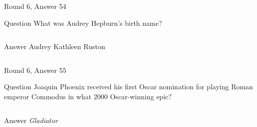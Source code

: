 \documentclass[11pt]{beamer}
\begin{document}
\begin{frame}[t]{Round 6, Answer 54}
  \vspace{2em}
  \begin{block}{Question}
    What was Audrey Hepburn's birth name?
  \end{block}
  \pause{}
  \begin{columns}[T,totalwidth=\linewidth]
    \begin{column}{0.35\linewidth}
      \begin{block}{Answer}
        Audrey Kathleen Ruston
      \end{block}
    \end{column}
    \begin{column}{0.6\linewidth}
      \begin{center}
        \texttt{[image: \{Images/hepburn]}.jpg}
      \end{center}
    \end{column}
  \end{columns}
\end{frame}


\begin{frame}[t]{Round 6, Answer 55}
  \vspace{2em}
  \begin{block}{Question}
    Joaquin Phoenix received his first Oscar nomination for playing Roman emperor Commodus in what 2000 Oscar-winning epic?
  \end{block}
  \pause{}
  \begin{columns}[T,totalwidth=\linewidth]
    \begin{column}{0.35\linewidth}
      \begin{block}{Answer}
        \emph{Gladiator}
      \end{block}
    \end{column}
    \begin{column}{0.6\linewidth}
      \begin{center}
        \texttt{[image: \{Images/jp-gladiator]}.jpg}
      \end{center}
    \end{column}
  \end{columns}
\end{frame}
\end{document}
